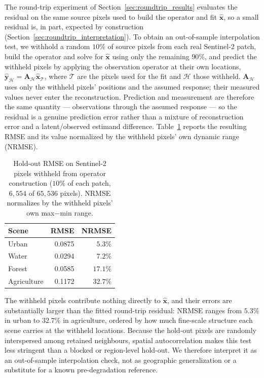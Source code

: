 \documentclass[journal]{IEEEtran}
\begin{document}
The round-trip experiment of Section~\ref{sec:roundtrip_results}
evaluates the residual on the same source pixels used to build
the operator and fit $\widehat{\mathbf{x}}$, so a small residual
is, in part, expected by construction
(Section~\ref{sec:roundtrip_interpretation}). To obtain an
out-of-sample interpolation test, we withhold a random $10\%$ of source
pixels from each real Sentinel-2 patch, build the operator and
solve for $\widehat{\mathbf{x}}$ using only the remaining $90\%$,
and predict the withheld pixels by applying the observation
operator at their own locations,
$\widehat{\mathbf y}_{\mathcal H}
=\mathbf A_{\mathcal H}\widehat{\mathbf x}_{\mathcal T}$,
where $\mathcal T$ are the pixels used for the fit and
$\mathcal H$ those withheld. $\mathbf A_{\mathcal H}$ uses only
the withheld pixels' positions and the assumed response; their
measured values never enter the reconstruction. Prediction and
measurement are therefore the same quantity --- observations
through the assumed response --- so the residual is a genuine
prediction error rather than a mixture of reconstruction error and
a latent/observed estimand difference. Table~\ref{tab:holdout} reports
the resulting RMSE and its value normalized by the withheld
pixels' own dynamic range (NRMSE).

\begin{table}[t]
\centering
\caption{Hold-out RMSE on Sentinel-2 pixels withheld from operator
construction ($10\%$ of each patch, $6{,}554$ of $65{,}536$
pixels). NRMSE normalizes by the withheld pixels' own
max$-$min range.}
\label{tab:holdout}
\begin{tabular}{lrr}
\toprule
Scene & RMSE & NRMSE \\
\midrule
Urban       & 0.0875 & $5.3\%$ \\
Water       & 0.0294 & $7.2\%$ \\
Forest      & 0.0585 & $17.1\%$ \\
Agriculture & 0.1172 & $32.7\%$ \\
\bottomrule
\end{tabular}
\end{table}

The withheld pixels contribute nothing directly to
$\widehat{\mathbf{x}}$, and their errors are substantially larger
than the fitted round-trip residual: NRMSE ranges from $5.3\%$ in
urban to $32.7\%$ in agriculture, ordered by how much fine-scale
structure each scene carries at the withheld locations. Because the hold-out pixels are
randomly interspersed among retained neighbours, spatial
autocorrelation makes this test less stringent than a blocked or
region-level hold-out. We therefore interpret it as an
out-of-sample interpolation check, not as geographic
generalization or a substitute for a known pre-degradation reference.
\end{document}
